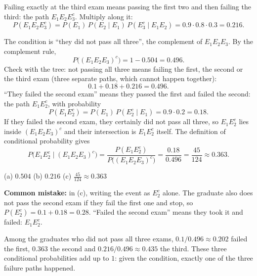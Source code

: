\begin{solution}
	 Failing exactly at the third exam means passing the first two
	and then failing the third: the path $E_1E_2E_3^c$. Multiply along it:
	\[ P(E_1E_2E_3^c)=P(E_1)\,P(E_2\mid E_1)\,P(E_3^c\mid E_1E_2)
		=0.9\cdot0.8\cdot0.3=0.216. \]

	 The condition is ``they did not pass all three'', the complement
	of $E_1E_2E_3$. By the complement rule,
	\[ P\big((E_1E_2E_3)^c\big)=1-0.504=0.496. \]
	Check with the tree: not passing all three means failing the first, the
	second or the third exam (three separate paths, which cannot happen
	together):
	\[ 0.1+0.18+0.216=0.496. \]
	``They failed the second exam'' means they passed the first and failed the
	second: the path $E_1E_2^c$, with probability
	\[ P(E_1E_2^c)=P(E_1)\,P(E_2^c\mid E_1)=0.9\cdot0.2=0.18. \]
	If they failed the second exam, they certainly did not pass all three, so
	$E_1E_2^c$ lies inside $(E_1E_2E_3)^c$ and their intersection is
	$E_1E_2^c$ itself. The definition of conditional probability gives
	\[ P\big(E_1E_2^c\mid(E_1E_2E_3)^c\big)
		=\frac{P(E_1E_2^c)}{P\big((E_1E_2E_3)^c\big)}
		=\frac{0.18}{0.496}=\frac{45}{124}\approx0.363. \]
	\begin{answer}
		(a) $0.504$ \quad (b) $0.216$ \quad (c) $\frac{45}{124}\approx0.363$
	\end{answer}
	\begin{remark}
		\textbf{Common mistake:} in (c), writing the event as $E_2^c$ alone.
		The graduate also does not pass the second exam if they fail the first
		one and stop, so $P(E_2^c)=0.1+0.18=0.28$. ``Failed the second exam'' means they
		took it and failed: $E_1E_2^c$.
	\end{remark}
	\begin{remark}
		Among the graduates who did not pass all three exams, $0.1/0.496\approx
		0.202$ failed the first, $0.363$ the second and $0.216/0.496\approx0.435$
		the third. These three conditional probabilities add up to $1$: given the
		condition, exactly one of the three failure paths happened.
	\end{remark}
\end{solution}

